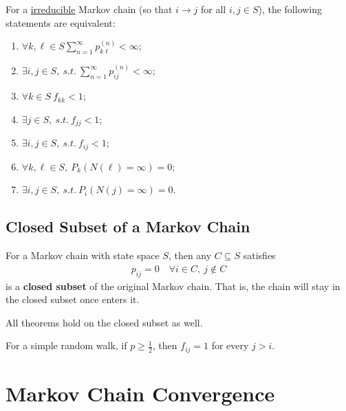 \documentclass{article}
\newcommand{\upn}[0]{^{(n)}}
\begin{document}
    \begin{theorem}
    	For a \ul{irreducible} Markov chain (so that $i \to j$ for all $i, j \in S$), the following statements are equivalent:
    	\begin{enumerate}[(1)]
    		\item $\forall k, \ell \in S \sum_{n=1}^\infty p_{k \ell}\upn < \infty$;
    		\item $\exists i,j \in S,\ s.t.\ \sum_{n=1}^\infty p_{ij}\upn < \infty$;
    		\item $\forall k \in S\ f_{kk} < 1$;
    		\item $\exists j \in S,\ s.t.\ f_{jj} < 1$;
    		\item $\exists i,j \in S,\ s.t.\ f_{ij} < 1$;
    		\item $\forall k, \ell \in S,\ P_k(N(\ell) = \infty) = 0$;
    		\item $\exists i, j \in S,\ s.t.\ P_i(N(j) = \infty) = 0$.
    	\end{enumerate}
    \end{theorem}


    \subsection{Closed Subset of a Markov Chain}
    
    \begin{definition}
    	For a Markov chain with state space $S$, then any $C \subseteq S$ satisfies
    	\begin{align}
    		p_{ij} = 0\quad \forall i \in C,\ j \notin C
    	\end{align}
    	is a \textbf{closed subset} of the original Markov chain. That is, the chain will stay in the closed subset once enters it.
    \end{definition}

	\begin{remark}
		All theorems hold on the closed subset as well.
	\end{remark}
    
    \begin{proposition}
    	For a simple random walk, if $p \geq \frac{1}{2}$, then $f_{ij} = 1$ for every $j > i$.
    \end{proposition}
    
    \section{Markov Chain Convergence}
\end{document}
